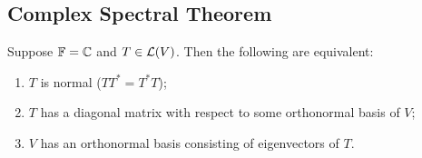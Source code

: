 \subsection{Complex Spectral Theorem}

\begin{thm}
  \label{thm: complex spectral theorem}
  Suppose $\mathbb{F} = \mathbb{C}$ and $T \in \mathcal{L}(V)$. Then the following are equivalent:
  \begin{enumerate}[label=\textbf{(\alph*)}]
    \item $T$ is normal ($TT^* = T^*T$);
    \item $T$ has a diagonal matrix with respect to some orthonormal basis of $V$;
    \item $V$ has an orthonormal basis consisting of eigenvectors of $T$.
  \end{enumerate}
\end{thm}
